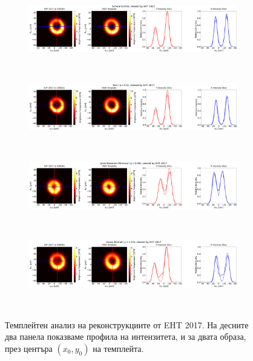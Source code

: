 \begin{figure}[h!]
	\centering
	\begin{subfigure}{12cm}
		\hspace{-1.5cm}
		\includegraphics[scale = 0.13]{Ehtim_Vida_plot_2017_230_Sch.png}
	\end{subfigure}\\
		\begin{subfigure}{12cm}
		\hspace{-1.5cm}
		\includegraphics[scale = 0.13]{Ehtim_Vida_plot_2017_230_Kerr.png}
	\end{subfigure}\\
	\begin{subfigure}{12cm}
		\hspace{-1.5cm}
		\includegraphics[scale = 0.13]{Ehtim_Vida_plot_2017_230_JNW.png}
	\end{subfigure}\\
	\begin{subfigure}{12cm}
		\hspace{-1.5cm}
		\includegraphics[scale = 0.13]{Ehtim_Vida_plot_2017_230_GB.png}
	\end{subfigure}\\
	\label{VIDA_EHT_ng2017}
	\caption[Темплейтен анализ на реконструкциите от EHT 2017]{\small Темплейтен анализ на реконструкциите от EHT 2017. На десните два панела показваме профила на интензитета, и за двата образа, през центъра $(x_0,y_0)$ на темплейта.} 
\end{figure}

